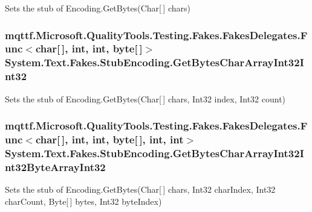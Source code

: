 Sets the stub of Encoding.\-Get\-Bytes(\-Char\mbox{[}$\,$\mbox{]} chars)

\hypertarget{class_system_1_1_text_1_1_fakes_1_1_stub_encoding_a2c94d64b2e19dbb2789d45c2b5bc4cd7}{
\subsubsection[{Get\-Bytes\-Char\-Array\-Int32\-Int32}]{\setlength{\rightskip}{0pt plus 5cm}mqttf.\-Microsoft.\-Quality\-Tools.\-Testing.\-Fakes.\-Fakes\-Delegates.\-Func$<$char\mbox{[}$\,$\mbox{]}, int, int, byte\mbox{[}$\,$\mbox{]}$>$ System.\-Text.\-Fakes.\-Stub\-Encoding.\-Get\-Bytes\-Char\-Array\-Int32\-Int32}}\label{class_system_1_1_text_1_1_fakes_1_1_stub_encoding_a2c94d64b2e19dbb2789d45c2b5bc4cd7}


Sets the stub of Encoding.\-Get\-Bytes(\-Char\mbox{[}$\,$\mbox{]} chars, Int32 index, Int32 count)

\hypertarget{class_system_1_1_text_1_1_fakes_1_1_stub_encoding_acf1e557019dcd16ef873db7459dcd5d1}{
\subsubsection[{Get\-Bytes\-Char\-Array\-Int32\-Int32\-Byte\-Array\-Int32}]{\setlength{\rightskip}{0pt plus 5cm}mqttf.\-Microsoft.\-Quality\-Tools.\-Testing.\-Fakes.\-Fakes\-Delegates.\-Func$<$char\mbox{[}$\,$\mbox{]}, int, int, byte\mbox{[}$\,$\mbox{]}, int, int$>$ System.\-Text.\-Fakes.\-Stub\-Encoding.\-Get\-Bytes\-Char\-Array\-Int32\-Int32\-Byte\-Array\-Int32}}\label{class_system_1_1_text_1_1_fakes_1_1_stub_encoding_acf1e557019dcd16ef873db7459dcd5d1}


Sets the stub of Encoding.\-Get\-Bytes(\-Char\mbox{[}$\,$\mbox{]} chars, Int32 char\-Index, Int32 char\-Count, Byte\mbox{[}$\,$\mbox{]} bytes, Int32 byte\-Index)

